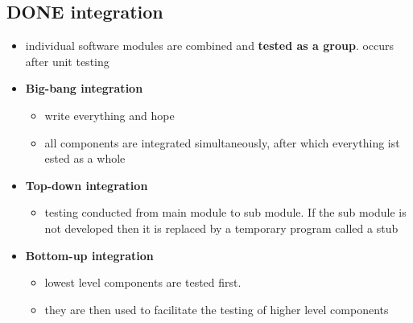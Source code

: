\documentclass[11pt]{article}
\begin{document}
\subsection{{\bfseries\sffamily DONE} integration}
\label{sec-3-2}
\begin{itemize}
\item individual software modules are combined and \textbf{tested as a group}. occurs after unit testing
\item \textbf{Big-bang integration}
\begin{itemize}
\item write everything and hope
\item all components are integrated simultaneously, after which everything ist ested as a whole
\end{itemize}
\item \textbf{Top-down integration}
\begin{itemize}
\item testing conducted from main module to sub module. If the sub module is not developed then it is replaced by a temporary program called a stub
\end{itemize}
\item \textbf{Bottom-up integration}
\begin{itemize}
\item lowest level components are tested first.
\item they are then used to facilitate the testing of higher level components
\end{itemize}
\end{itemize}
\end{document}
